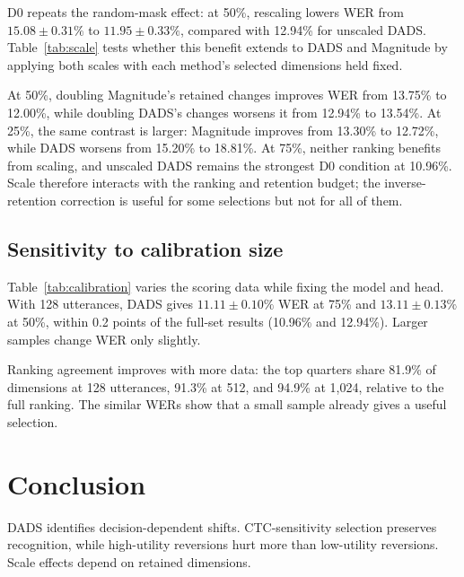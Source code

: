 \documentclass{article}
\begin{document}
D0 repeats the random-mask effect: at 50\%, rescaling lowers WER from $15.08\pm0.31\%$ to $11.95\pm0.33\%$, compared with 12.94\% for unscaled DADS. Table~\ref{tab:scale} tests whether this benefit extends to DADS and Magnitude by applying both scales with each method's selected dimensions held fixed.

\begin{table}[t]
\centering
\caption{D0 test WER (\%) with the same two prespecified scales applied to each ranking. Bold marks the lowest WER at each budget.}
\label{tab:scale}

\end{table}

At 50\%, doubling Magnitude's retained changes improves WER from 13.75\% to 12.00\%, while doubling DADS's changes worsens it from 12.94\% to 13.54\%. At 25\%, the same contrast is larger: Magnitude improves from 13.30\% to 12.72\%, while DADS worsens from 15.20\% to 18.81\%. At 75\%, neither ranking benefits from scaling, and unscaled DADS remains the strongest D0 condition at 10.96\%. Scale therefore interacts with the ranking and retention budget; the inverse-retention correction is useful for some selections but not for all of them.

\subsection{Sensitivity to calibration size}
Table~\ref{tab:calibration} varies the scoring data while fixing the model and head. With 128 utterances, DADS gives $11.11\pm0.10\%$ WER at 75\% and $13.11\pm0.13\%$ at 50\%, within 0.2 points of the full-set results (10.96\% and 12.94\%). Larger samples change WER only slightly.

\begin{table}[tb]
\centering
\caption{D0 calibration size: test WER (\%) and overlap with the full-set top quarter. Smaller sets report mean $\pm$ SD over three subsets.}
\label{tab:calibration}
\setlength{\tabcolsep}{4pt}

\end{table}

Ranking agreement improves with more data: the top quarters share 81.9\% of dimensions at 128 utterances, 91.3\% at 512, and 94.9\% at 1,024, relative to the full ranking. The similar WERs show that a small sample already gives a useful selection.

\section{Conclusion}
\label{sec:conclusion}
DADS identifies decision-dependent shifts. CTC-sensitivity selection preserves recognition, while high-utility reversions hurt more than low-utility reversions. Scale effects depend on retained dimensions.

\clearpage


\end{document}
